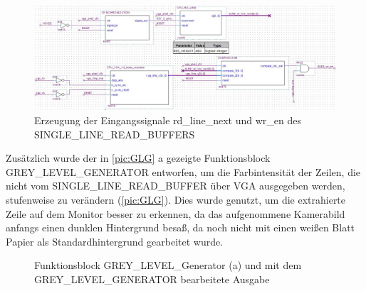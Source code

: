 \documentclass[ngerman,12pt]{article} %
\begin{document}
{\begin{figure}[htbp]
	\begin{center}
	\includegraphics[width = \textwidth]{SLRB_wr_en_20200107_bearbeitet}
	\caption[Erzeugung der Eingangssignale rd\_line\_next und wr\_en des SINGLE\_LINE\_READ\_BUFFERS ]{\label{pic:SINGLE_LINE_READ_BUFFER-Beschaltung}Erzeugung der Eingangssignale rd\_line\_next und wr\_en des SINGLE\_LINE\_READ\_BUFFERS }
	\end{center}
\end{figure}

Zusätzlich wurde der in \autoref{pic:GLG} a gezeigte Funktionsblock GREY\_LEVEL\_GENERATOR entworfen, um die Farbintensität der Zeilen, die nicht vom SINGLE\_LINE\_READ\_BUFFER über VGA ausgegeben werden, stufenweise zu verändern (\autoref{pic:GLG}). Dies wurde genutzt, um die extrahierte Zeile auf dem Monitor besser zu erkennen, da das aufgenommene Kamerabild anfangs einen dunklen Hintergrund besaß, da noch nicht mit einen weißen Blatt Papier als Standardhintergrund gearbeitet wurde.

\begin{figure}[h!tb]
  \centering
  \qquad
  \caption[Funktionsblock GREY\_LEVEL\_Generator]{\label{pic:GLG}Funktionsblock GREY\_LEVEL\_Generator (a) und mit dem GREY\_LEVEL\_GENERATOR bearbeitete Ausgabe}
\end{figure}



}
\end{document}
